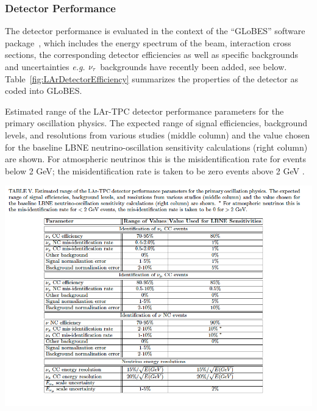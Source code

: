 \subsubsection{Detector Performance}

The detector performance is evaluated in the context of the ``GLoBES''
software package~\cite{GLoBES}, which includes the energy spectrum of
the beam, interaction cross sections, the corresponding detector
efficiencies as well as specific  backgrounds and uncertainties {\it
{e.g.}} $\nu_\tau$  backgrounds have recently been added, see
below. Table~\ref{fig:LArDetectorEfficiency} summarizes the properties
of the detector as coded into GLoBES. 

\begin{table}[!bp]
\caption{Estimated range of the LAr-TPC detector performance parameters for the primary oscillation physics. The expected
range of signal efficiencies, background levels, and resolutions from various studies (middle column) and the value chosen for
the baseline LBNE neutrino-oscillation sensitivity calculations (right column) are shown. For atmospheric neutrinos this is
the misidentification rate for events below 2 GeV; the misidentification rate is taken to be zero events  above 2 GeV \cite{PWGReconfigurationReport}.}\begin{center}
\includegraphics[trim = 0cm 0cm 0cm 2cm, clip=true, width=1.0\textwidth]{RWK/LBNE/LArDetctorEffeciencyTable.pdf}
\label{fig:LArDetectorEfficiency}
\end{center}
\vspace{-1.2cm}
\end{table}


